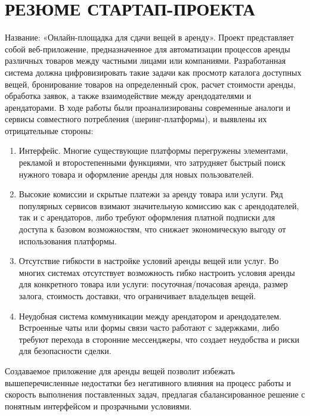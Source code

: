 \newpage
\section*{РЕЗЮМЕ СТАРТАП-ПРОЕКТА}


Название: «Онлайн-площадка для сдачи вещей в аренду». Проект представляет собой веб-приложение, предназначенное для автоматизации процессов аренды различных товаров между частными лицами или компаниями. Разработанная система должна цифровизировать такие задачи как просмотр каталога доступных вещей, бронирование товаров на определенный срок, расчет стоимости аренды, обработка заявок, а также взаимодействие между арендодателями и арендаторами. В ходе работы были проанализированы современные аналоги и сервисы совместного потребления (шеринг-платформы), и выявлены их отрицательные стороны:

\begin{enumerate}
	\item Интерфейс. Многие существующие платформы перегружены элементами, рекламой и второстепенными функциями, что затрудняет быстрый поиск нужного товара и оформление аренды для новых пользователей.
	
	\item Высокие комиссии и скрытые платежи за аренду товара или услуги. Ряд популярных сервисов взимают значительную комиссию как с арендодателей, так и с арендаторов, либо требуют оформления платной подписки для доступа к базовом возможностям, что снижает экономическую выгоду от использования платформы.
	
	\item Отсутствие гибкости в настройке условий аренды вещей или услуг. Во многих системах отсутствует возможность гибко настроить условия аренды для конкретного товара или услуги: посуточная/почасовая аренда, размер залога, стоимость доставки, что ограничивает владельцев вещей.
	
	\item Неудобная система коммуникации между арендатором и арендодателем. Встроенные чаты или формы связи часто работают с задержками, либо требуют перехода в сторонние мессенджеры, что создает неудобства и риски для безопасности сделки.
	
\end{enumerate}

Создаваемое приложение для аренды вещей позволит избежать вышеперечисленные недостатки без негативного влияния на процесс работы и скорость выполнения поставленных задач, предлагая сбалансированное решение с понятным интерфейсом и прозрачными условиями.

